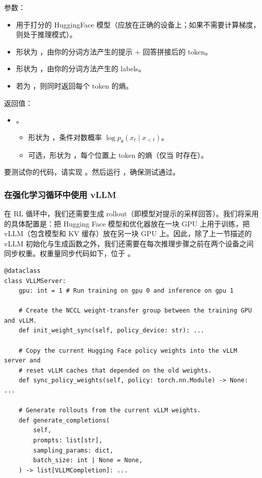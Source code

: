 参数：

\begin{itemize}
  \item {} 用于打分的 HuggingFace 模型（应放在正确的设备上；如果不需要计算梯度，则处于推理模式）。
  \item {} 形状为 ，由你的分词方法产生的提示 + 回答拼接后的 token。
  \item {} 形状为 ，由你的分词方法产生的 labels。
  \item {} 若为 ，则同时返回每个 token 的熵。
\end{itemize}

返回值：

\begin{itemize}
  \item {}。
  \begin{itemize}
    \item {} 形状为 ，条件对数概率 $\log p_\theta(x_t \mid x_{<t})$。
    \item {} 可选，形状为 ，每个位置上 token 的熵（仅当  时存在）。
  \end{itemize}
\end{itemize}

要测试你的代码，请实现 。然后运行 ，确保测试通过。

\subsubsection{在强化学习循环中使用 vLLM}

在 RL 循环中，我们还需要生成 rollout（即模型对提示的采样回答）。我们将采用的具体配置是：把 Hugging Face 模型和优化器放在一块 GPU 上用于训练，把 vLLM（包含模型和 KV 缓存）放在另一块 GPU 上。因此，除了上一节描述的 vLLM 初始化与生成函数之外，我们还需要在每次推理步骤之前在两个设备之间同步权重。权重量同步代码如下，位于 。

\begin{lstlisting}
@dataclass
class VLLMServer:
    gpu: int = 1 # Run training on gpu 0 and inference on gpu 1

    # Create the NCCL weight-transfer group between the training GPU and vLLM.
    def init_weight_sync(self, policy_device: str): ...

    # Copy the current Hugging Face policy weights into the vLLM server and
    # reset vLLM caches that depended on the old weights.
    def sync_policy_weights(self, policy: torch.nn.Module) -> None: ...

    # Generate rollouts from the current vLLM weights.
    def generate_completions(
        self,
        prompts: list[str],
        sampling_params: dict,
        batch_size: int | None = None,
    ) -> list[VLLMCompletion]: ...
\end{lstlisting}

